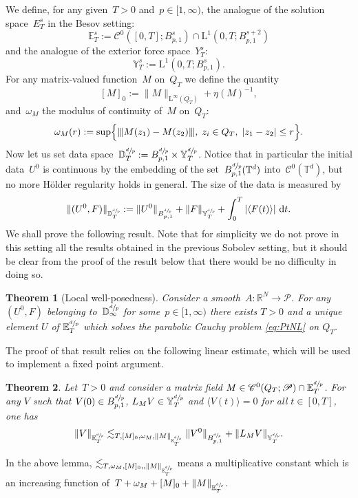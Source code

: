 \documentclass[10pt]{amsart}
\newtheorem{thm}{Theorem}
\theoremstyle{definition}
\newcommand\R{\mathbb{R}}
\newcommand\E{\mathbb{E}}
\newcommand\T{\mathbb{T}}
\newcommand\dd{\mathrm{d}}
\renewcommand\L{\mathrm{L}}
\newcommand{\vertiii}[1]{{\vert\kern-0.08em\vert\kern-0.08em\vert #1 \vert\kern-0.08em\vert\kern-0.08em\vert}}
\begin{document}
We define, for any given~$T>0$ and~$p \in [1,\infty)$, the analogue of the solution space~$E_T^s$ in the Besov setting:
\[
\E^s_T:= \mathcal C^0 ([0,T];B^s_{p,1}) \cap \L^1 (0,T;B^{s+2}_{p,1})
\]
and the analogue of the exterior force space~$Y_T^s$:
\[
{\mathbb Y}_T^{s}:= \L^1 (0,T;B^{s }_{p,1}).
\]
For any matrix-valued function~$M$ on~$Q_T$ we define the quantity
\begin{equation}\label{defnormalphabesov}
[M]_{0}:=\|M\|_{\L^\infty(Q_T)}+\eta(M)^{-1},\end{equation}
and~$ \omega_M $ the modulus of continuity of~$M$ on~$Q_T$:
\[
\omega_M(r):=\sup\Bigl\{ \vertiii {M(z_1)- M(z_2)}, \; z_i \in Q_T, \; |z_1-z_2| \leq r\Bigr\}.
\]
Now let us set data space~$
\mathbb D_T^{\sfrac dp}:=B^{\sfrac dp}_{p,1}\times{\mathbb Y}_T^{\sfrac dp} $. Notice that in particular the initial data~$U^0$ is continuous by the embedding of the set~$B^{\sfrac dp}_{p,1}(\T^d)$ into~$ \mathcal C^0(\T^d)$, but no more H\"older regularity holds in general. The size of the data is measured by
\[
\|(U^0,F)\|_{ \mathbb D_T^{\sfrac dp}}:= \|U^0\|_{B^{\sfrac dp}_{p,1}} + \|F\|_{{\mathbb Y}_T^{\sfrac dp} } + \int_0^T \left|\langle F(t)\rangle\right|\,\dd t.
\]
We shall prove the following result. Note that for simplicity we do not prove in this setting all the results obtained in the previous Sobolev setting, but it should be clear from the proof of the result below that there would be no difficulty in doing so.

\begin{thm}[Local well-posedness] \label{thm:exlocbesov}
Consider a smooth~$A:\R^N\to \mathscr{P}$. For any $(U^0,F)$ belonging to~$ \mathbb D_\infty^{\sfrac dp}$ for some~$p \in [1,\infty)$ there exists $T>0$ and a unique element $U$ of $\E^{\sfrac dp}_T$ which solves the parabolic Cauchy problem \eqref{eq:PtNL} on $Q_T$.
\end{thm}

The proof of that result relies on the following linear estimate, which will be used to implement a fixed point argument.
\begin{thm} \label{thm:PetrovskiiBesov}
Let~$T>0$ and consider a matrix field $M\in\mathscr{C}^{0}(Q_T;\mathscr{P})\cap \E^{\sfrac dp}_T$. For any $V$ such that $V(0)\in B^{\sfrac dp}_{p,1}$, $L_{M }V\in{\mathbb Y}_T^{\sfrac dp} $ and $\langle V(t)\rangle=0$ for all $t\in[0,T]$, one has
\begin{align}\label{thm2Hsestimate:bes}
\| V \|_{ \E^{\sfrac dp}_T} \lesssim_{T,[M]_{0},\omega_M,\|M\|_{ \E^{\sfrac dp}_T}} \|V^0\|_{B^{\sfrac dp}_{p,1}} + \|L_{M }V\|_{{\mathbb Y}_T^{\sfrac dp}}.
\end{align}
\end{thm}
In the above lemma, $ \lesssim_{T,\omega_M,[M]_0,,\|M\|_{ \E^{\sfrac dp}_T}} $ means a multiplicative constant which is an increasing function of~$T+\omega_M+[M]_0+\|M\|_{ \E^{\sfrac dp}_T}$.
\end{document}

